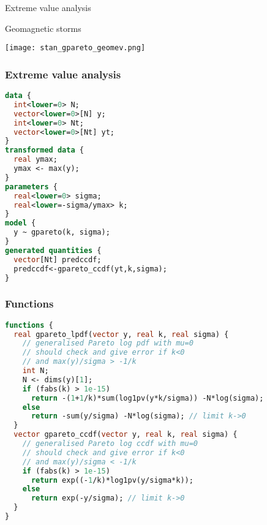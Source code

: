 \documentclass[finnish,english,t]{beamer}
\begin{document}
\begin{frame}{Extreme value analysis}

Geomagnetic storms

\texttt{[image: stan\_gpareto\_geomev.png]}  

\end{frame}

\begin{frame}[fragile]
  \frametitle{Extreme value analysis}
  {\footnotesize
  \begin{lstlisting}[language=Stan]
data {
  int<lower=0> N;
  vector<lower=0>[N] y;
  int<lower=0> Nt;
  vector<lower=0>[Nt] yt;
}
transformed data {
  real ymax;
  ymax <- max(y);
}
parameters {
  real<lower=0> sigma; 
  real<lower=-sigma/ymax> k; 
}
model {
  y ~ gpareto(k, sigma);
}
generated quantities {
  vector[Nt] predccdf;
  predccdf<-gpareto_ccdf(yt,k,sigma);
}
  \end{lstlisting}
}
\end{frame} 

\begin{frame}[fragile]
  \frametitle{Functions}
  {\footnotesize
  \begin{lstlisting}[language=Stan]
functions {
  real gpareto_lpdf(vector y, real k, real sigma) {
    // generalised Pareto log pdf with mu=0
    // should check and give error if k<0 
    // and max(y)/sigma > -1/k
    int N;
    N <- dims(y)[1];
    if (fabs(k) > 1e-15)
      return -(1+1/k)*sum(log1pv(y*k/sigma)) -N*log(sigma);
    else
      return -sum(y/sigma) -N*log(sigma); // limit k->0
  }
  vector gpareto_ccdf(vector y, real k, real sigma) {
    // generalised Pareto log ccdf with mu=0
    // should check and give error if k<0 
    // and max(y)/sigma < -1/k
    if (fabs(k) > 1e-15)
      return exp((-1/k)*log1pv(y/sigma*k));
    else
      return exp(-y/sigma); // limit k->0
  }
}
  \end{lstlisting}
}
\end{frame} 
\end{document}
